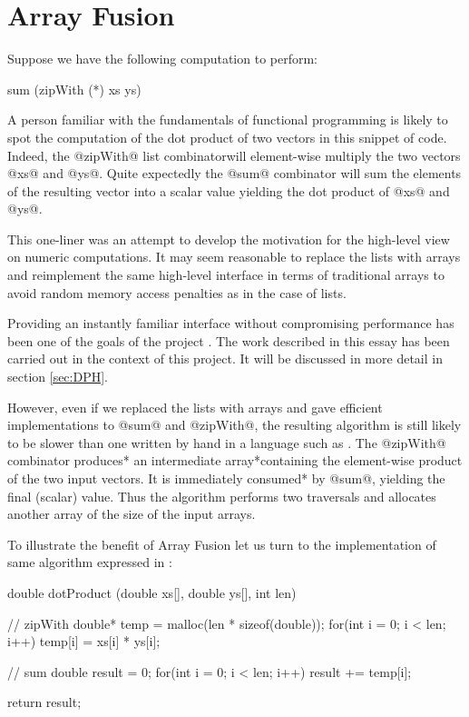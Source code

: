 \documentclass[preamble.tex]{subfiles}
\begin{document}
\clearpage

\chapter{Array Fusion}
\label{ch:Fusion}

Suppose we have the following computation to perform:

\begin{hscode}
sum (zipWith (*) xs ys)
\end{hscode}

A person familiar with the fundamentals of functional programming is likely to spot the computation of the dot product of two vectors in this snippet of \Haskell code. Indeed, the @zipWith@ list combinator\icomb will element-wise multiply the two vectors @xs@ and @ys@. Quite expectedly the @sum@ combinator will sum the elements of the resulting vector into a scalar value yielding the dot product of @xs@ and @ys@.

This one-liner was an attempt to develop the motivation for the high-level view on numeric computations. It may seem reasonable to replace the lists with arrays and reimplement the same high-level interface in terms of traditional arrays to avoid random memory access penalties as in the case of lists.

Providing an instantly familiar interface without compromising performance has been one of the goals of the \idph project \cite{PLKC08,CLP+07}. The work described in this essay has been carried out in the context of this project. It will be discussed in more detail in section \ref{sec:DPH}.

However, even if we replaced the lists with arrays and gave efficient implementations to @sum@ and @zipWith@, the resulting algorithm is still likely to be slower than one written by hand in a language such as \C. The @zipWith@ combinator \*produces* an \*intermediate array*\iintermediate containing the element-wise product of the two input vectors. It is immediately \*consumed* by @sum@, yielding the final (scalar) value. Thus the algorithm performs two traversals and allocates another array of the size of the input arrays.

To illustrate the benefit of Array Fusion let us turn to the implementation of same algorithm expressed in \C:


\begin{ccode}
double dotProduct (double xs[], double ys[], int len) {
	// zipWith
	double* temp = malloc(len * sizeof(double));
	for(int i = 0; i < len; i++)
		temp[i] = xs[i] * ys[i];

	// sum
	double result = 0;
	for(int i = 0; i < len; i++)
		result += temp[i];

	return result;
}
\end{ccode}
\end{document}
